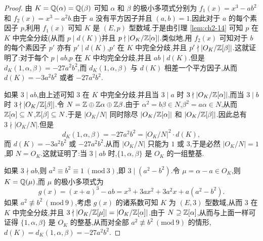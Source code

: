 \begin{proof}
由 $K=\mathbb{Q}(\alpha)=\mathbb{Q}(\beta)$ 可知 $\alpha$ 和 $\beta$ 的极小多项式分别为 $f_1(x)=x^3-ab^2$ 和 $f_2(x)=x^3-a^2b$.由于 $a$ 没有平方因子并且 $(a,b)=1$.因此对于 $a$ 的每个素因子 $p$,利用 $f_1(x)$ 可知 $K$ 是 $(E,p)$ 型数域.于是由引理 \ref{lem:ch2-14} 可知 $p$ 在 $K$ 中完全分歧(从而 $p\mid d(K)$)并且 $p\nmid|O_K/\mathbb{Z}[\alpha]|$.类似地,用 $f_2(x)$ 可知对于 $b$ 的每个素因子 $p'$ 亦有 $p'\mid d(K)$,$p'$ 在 $K$ 中完全分歧,并且 $p'\nmid|O_K/\mathbb{Z}[\beta]|$.这就证明了:对于每个 $p\mid ab$,$p$ 在 $K$ 中均完全分歧,并且 $ab\mid d(K)$.但是 $d_K(1,\alpha,\beta)=-27a^2b^2$,而 $d_K(1,\alpha,\beta)$ 与 $d(K)$ 相差一个平方因子,从而 $d(K)=-3a^2b^2$ 或者 $-27a^2b^2$.

如果 $3\mid ab$,由上述可知 $3$ 在 $K$ 中完全分歧.并且当 $3\mid a$ 时 $3\nmid|O_K/\mathbb{Z}[\alpha]|$,而当 $3\mid b$ 时 $3\nmid|O_K/\mathbb{Z}[\beta]|$.令 $N=\mathbb{Z}\oplus\mathbb{Z}\alpha\oplus\mathbb{Z}\beta$.由于 $\alpha^2=b\beta\in N$,$\beta^2=a\alpha\in N$,从而 $\mathbb{Z}[\alpha]\subseteq N$,$\mathbb{Z}[\beta]\subseteq N$.于是 $|O_K/N|$ 同时除尽 $|O_K/\mathbb{Z}[\alpha]|$ 和 $|O_K/\mathbb{Z}[\beta]|$.因此总有 $3\nmid|O_K/N|$.但是
\[
  d_K(1,\alpha,\beta)=-27a^2b^2=|O_K/N|^2\cdot d(K),
\]
而 $d(K)=-3a^2b^2$ 或 $-27a^2b^2$.从而 $|O_K/N|$ 只能为 $1$ 或 $3$,于是必然 $|O_K/N|=1$,即 $N=O_K$.这就证明了:当 $3\mid ab$ 时,$\{1,\alpha,\beta\}$ 是 $O_K$ 的一组整基.

如果 $3\nmid ab$,则 $a^2\equiv b^2\equiv 1\ (\mathrm{mod}\ 3)$,即 $3\mid(a^2-b^2)$.令 $\mu=\alpha-a\in O_K$,则 $K=\mathbb{Q}(\mu)$,而 $\mu$ 的极小多项式为
\[
  g(x)=(x+a)^3-ab=x^3+3ax^2+3a^2x+a(a^2-b^2).
\]
如果 $a^2\not\equiv b^2\ (\mathrm{mod}\ 9)$,考虑 $g(x)$ 的诸系数可知 $K$ 为 $(E,3)$ 型数域,从而 $3$ 在 $K$ 中完全分歧,并且 $3\nmid|O_K/\mathbb{Z}[\mu]|=|O_K/\mathbb{Z}[\alpha]|$.由于 $N\supseteq\mathbb{Z}[\alpha]$,从而与上面一样可证得 $\{1,\alpha,\beta\}$ 是 $O_K$ 的整基,从而对全部 $a^2\not\equiv b^2\ (\mathrm{mod}\ 9)$ 的情形,$d(K)=d_K(1,\alpha,\beta)=-27a^2b^2$.


\end{proof}
